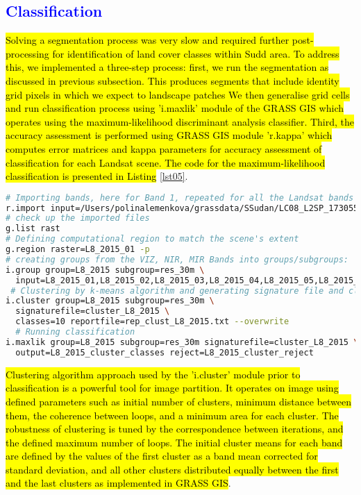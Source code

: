 \documentclass[sustainability,article,submit,pdftex,moreauthors]{Definitions/mdpi}
\begin{document}
\subsection{\textcolor{blue}{Classification}}

\hl{Solving a segmentation process was very slow and required further post-processing for identification of land cover classes within Sudd area. To address this, we implemented a three-step process: first, we run the segmentation as discussed in previous subsection. This produces segments that include identity grid pixels in which we expect to landscape patches We then generalise grid cells and run classification process using 'i.maxlik' module of the GRASS GIS which operates using the maximum-likelihood discriminant analysis classifier. Third, the accuracy assessment is performed using GRASS GIS module 'r.kappa' which computes error matrices and kappa parameters for accuracy assessment of classification for each Landsat scene. The code for the maximum-likelihood classification is presented in Listing }\ref{lst05}.

\begin{lstlisting}[language=bash,caption=GRASS GIS code for classification of the Sudd region based on the segmented raster image Landsat 9 OLI/TIRS,style=mystyle,label={lst05}]
# Importing bands, here for Band 1, repeated for all the Landsat bands likewise
r.import input=/Users/polinalemenkova/grassdata/SSudan/LC08_L2SP_173055_20150108_20200910_02_T1_SR_B1.TIF output=L8_2015_01 resample=bilinear extent=region resolution=region --overwrite
# check up the imported files
g.list rast
# Defining computational region to match the scene's extent
g.region raster=L8_2015_01 -p
# creating groups from the VIZ, NIR, MIR Bands into groups/subgroups:
i.group group=L8_2015 subgroup=res_30m \
  input=L8_2015_01,L8_2015_02,L8_2015_03,L8_2015_04,L8_2015_05,L8_2015_06,L8_2015_07
 # Clustering by k-means algorithm and generating signature file and clustering report (presented in Appendix B)
i.cluster group=L8_2015 subgroup=res_30m \
  signaturefile=cluster_L8_2015 \
  classes=10 reportfile=rep_clust_L8_2015.txt --overwrite
  # Running classification
i.maxlik group=L8_2015 subgroup=res_30m signaturefile=cluster_L8_2015 \
  output=L8_2015_cluster_classes reject=L8_2015_cluster_reject
\end{lstlisting}

\hl{Clustering algorithm approach used by the 'i.cluster' module prior to classification is a powerful tool for image partition. It operates on image using defined parameters such as initial number of clusters, minimum distance between them, the coherence between loops, and a minimum area for each cluster. The robustness of clustering is tuned by the correspondence between iterations, and the defined maximum number of loops. The initial cluster means for each band are defined by the values of the first cluster as a band mean corrected for standard deviation, and all other clusters distributed equally between the first and the last clusters as implemented in GRASS GIS}. 
\end{document}
